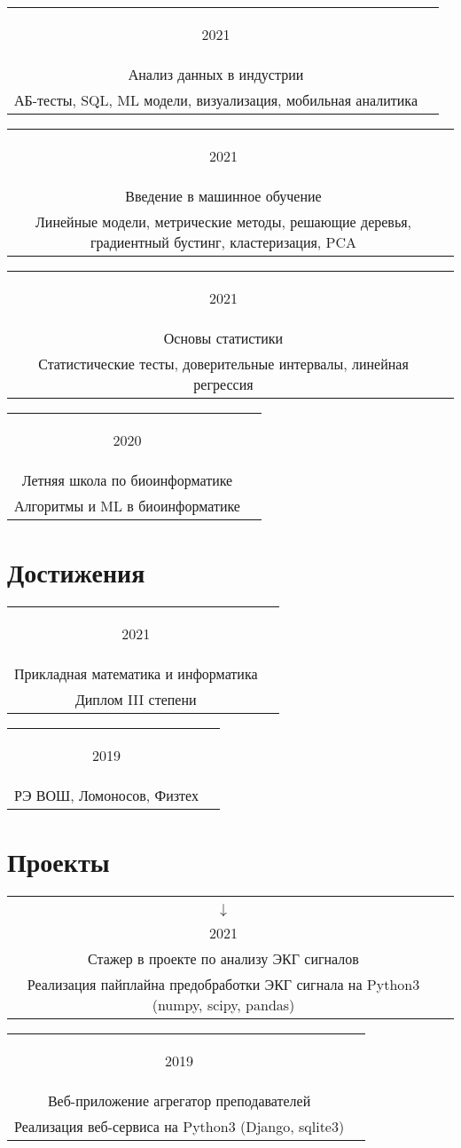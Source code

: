 \documentclass{article}
\newcommand{\entry}[3]{
	\begin{tabular}{ c | c }
    \begin{minipage}{0.05\linewidth}
    	\begin{center}
    		#1
    	\end{center}
    \end{minipage} 
    &
    \begin{minipage}{0.85\linewidth}
        \textbf{#2} \\ \footnotesize{#3}
    \end{minipage}
    \end{tabular}
}
\newcommand{\interval}[2]{
	#1 \\ $\downarrow$ \\ #2
}
\begin{document}
    \entry {2021}
        {Тинькофф образование\\
        Анализ данных в индустрии}
        {АБ-тесты, SQL, ML модели, визуализация, мобильная аналитика}
    
    \vspace{.1cm}
    
    \entry {2021}
    {Coursera\\
    Введение в машинное обучение}
    {Линейные модели, метрические методы, решающие деревья, градиентный бустинг, кластеризация, PCA}
      
    \vspace{.1cm}
    
    \entry {2021}
    {Stepik\\
    Основы статистики}
    {Статистические тесты, доверительные интервалы, линейная регрессия}
    
    \vspace{.1cm}
    
    \entry {2020}
    {Институт биоинформатики\\
    Летняя школа по биоинформатике}
    {Алгоритмы и ML в биоинформатике}
    
    \section{Достижения}
    
    \entry {2021}
        {Олимпиада студентов и выпускников <<Высшая лига>>\\
        Прикладная математика и информатика}
        {Диплом III степени}
        
    \vspace{.1cm}
    
    \entry {2019}
    {Победитель и призер олимпиад школьников по математике}
    {РЭ ВОШ, Ломоносов, Физтех}

    \section{Проекты}
        
    \entry {\interval{2020}{2021}}
    {IQ-Beat\\
    Стажер в проекте по анализу ЭКГ сигналов}
    {Реализация пайплайна предобработки ЭКГ сигнала на Python3 (numpy, scipy, pandas)} 
    
    \vspace{.1cm}
        
    \entry {2019}
    {Московская школа программистов Яндекс\\
    Веб-приложение агрегатор преподавателей}
    {Реализация веб-сервиса на Python3 (Django, sqlite3)} 
\end{document}
